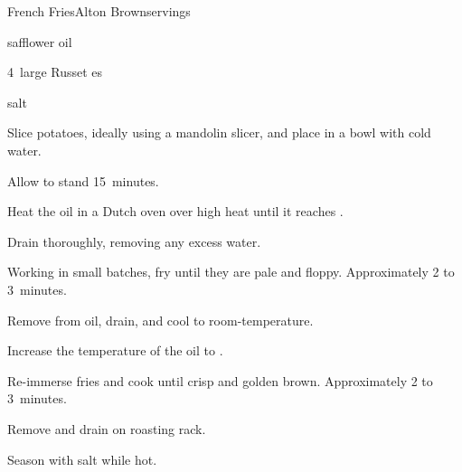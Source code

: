 \begin{recipe}{French Fries}{Alton Brown}{servings}

\begin{ingredients}
\item {} safflower oil
\item 4~large Russet es
\item salt
\end{ingredients}

\begin{directions}
\item Slice potatoes, ideally using a mandolin slicer, and place in a bowl with cold water.
\item Allow to stand 15~minutes.
\item Heat the oil in a Dutch oven over high heat until it reaches .
\item Drain thoroughly, removing any excess water.
\item Working in small batches, fry until they are pale and floppy. Approximately 2 to 3~minutes.
\item Remove from oil, drain, and cool to room-temperature.
\item Increase the temperature of the oil to .
\item Re-immerse fries and cook until crisp and golden brown. Approximately 2 to 3~minutes.
\item Remove and drain on roasting rack.
\item Season with salt while hot.
\end{directions}

\end{recipe}
